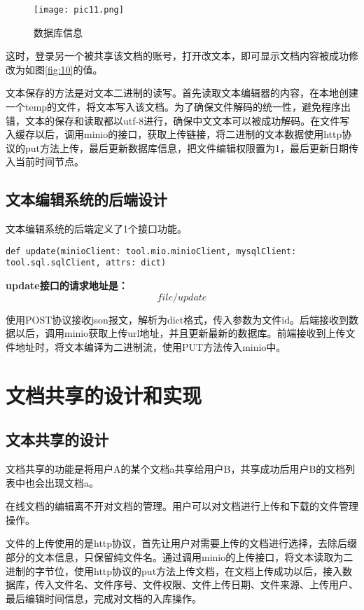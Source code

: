 \documentclass[forprint]{software}
\begin{document}
\begin{figure}[!htbp]
	\centering
	\texttt{[image: pic11.png]}
	\caption{数据库信息}
	\label{fig:11}
\end{figure}

这时，登录另一个被共享该文档的账号，打开改文本，即可显示文档内容被成功修改为如图\ref{fig:10}的值。

文本保存的方法是对文本二进制的读写。首先读取文本编辑器的内容，在本地创建一个temp的文件，将文本写入该文档。为了确保文件解码的统一性，避免程序出错，文本的保存和读取都以utf-8进行，确保中文文本可以被成功解码。在文件写入缓存以后，调用minio的接口，获取上传链接，将二进制的文本数据使用http协议的put方法上传，最后更新数据库信息，把文件编辑权限置为1，最后更新日期传入当前时间节点。

\subsection{文本编辑系统的后端设计}

文本编辑系统的后端定义了1个接口功能。

\begin{lstlisting}
def update(minioClient: tool.mio.minioClient, mysqlClient: tool.sql.sqlClient, attrs: dict)
\end{lstlisting}

\textbf{update接口的请求地址是：}
\begin{equation*}
	file/update
\end{equation*}

使用POST协议接收json报文，解析为dict格式，传入参数为文件id。后端接收到数据以后，调用minio获取上传url地址，并且更新最新的数据库。前端接收到上传文件地址时，将文本编译为二进制流，使用PUT方法传入minio中。


\section{文档共享的设计和实现}

\subsection{文本共享的设计}

文档共享的功能是将用户A的某个文档a共享给用户B，共享成功后用户B的文档列表中也会出现文档a。

在线文档的编辑离不开对文档的管理。用户可以对文档进行上传和下载的文件管理操作。

文件的上传使用的是http协议，首先让用户对需要上传的文档进行选择，去除后缀部分的文本信息，只保留纯文件名。通过调用minio的上传接口，将文本读取为二进制的字节位，使用http协议的put方法上传文档，在文档上传成功以后，接入数据库，传入文件名、文件序号、文件权限、文件上传日期、文件来源、上传用户、最后编辑时间信息，完成对文档的入库操作。
\end{document}
